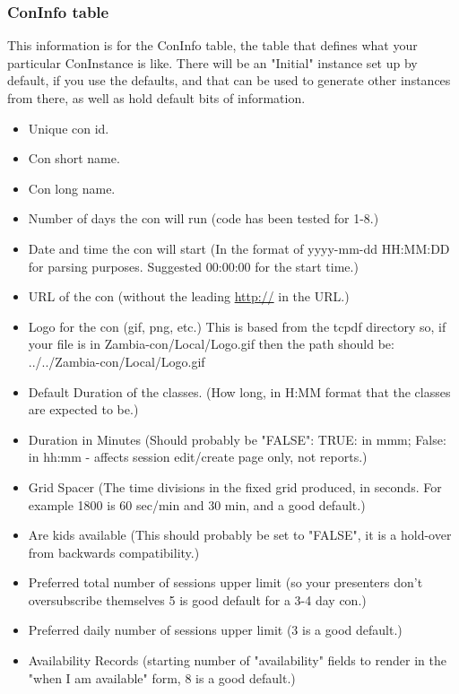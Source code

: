 \documentclass[captions=tablesignature]{scrartcl}
\begin{document}
\subsubsection{ConInfo table}
\label{sec-1-2-4}
This information is for the ConInfo table, the table that defines
what your particular ConInstance is like.  There will be an
"Initial" instance set up by default, if you use the defaults, and
that can be used to generate other instances from there, as well
as hold default bits of information.
\begin{itemize}
\item Unique con id.
\item Con short name.
\item Con long name.
\item Number of days the con will run (code has been tested for 1-8.)
\item Date and time the con will start (In the format of yyyy-mm-dd
HH:MM:DD for parsing purposes.  Suggested 00:00:00 for the
start time.)
\item URL of the con (without the leading \url{http://} in the URL.)
\item Logo for the con (gif, png, etc.)  This is based from the tcpdf
directory so, if your file is in Zambia-con/Local/Logo.gif then
the path should be: ../../Zambia-con/Local/Logo.gif
\item Default Duration of the classes. (How long, in H:MM format that
the classes are expected to be.)
\item Duration in Minutes (Should probably be "FALSE": TRUE: in mmm;
False: in hh:mm - affects session edit/create page only, not
reports.)
\item Grid Spacer (The time divisions in the fixed grid produced, in
seconds.  For example 1800 is 60 sec/min and 30 min, and a good
default.)
\item Are kids available (This should probably be set to "FALSE", it
is a hold-over from backwards compatibility.)
\item Preferred total number of sessions upper limit (so your
presenters don't oversubscribe themselves 5 is good default for
a 3-4 day con.)
\item Preferred daily number of sessions upper limit (3 is a good
default.)
\item Availability Records (starting number of "availability" fields
to render in the "when I am available" form, 8 is a good
default.)
\end{itemize}
\end{document}
